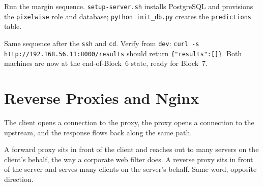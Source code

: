  Run the margin sequence.
\texttt{setup-server.sh} installs PostgreSQL and provisions the
\texttt{pixelwise} role and database; \texttt{python init\_db.py}
creates the \texttt{predictions} table.


 Same sequence after the \texttt{ssh} and
\texttt{cd}. Verify from \texttt{dev}:
\texttt{curl -s http://192.168.56.11:8000/results} should return
\texttt{\{"results":[]\}}. Both machines are now at the end-of-Block~6
state, ready for Block~7.


\newpage
\section{Reverse Proxies and Nginx}

The client opens a connection to the proxy, the proxy opens a connection
to the upstream, and the response flows back along the same path.


A forward proxy sits in front of the client and reaches out to many
servers on the client's behalf, the way a corporate web filter does.
A reverse proxy sits in front of the server and serves many clients on
the server's behalf.
Same word, opposite direction.

